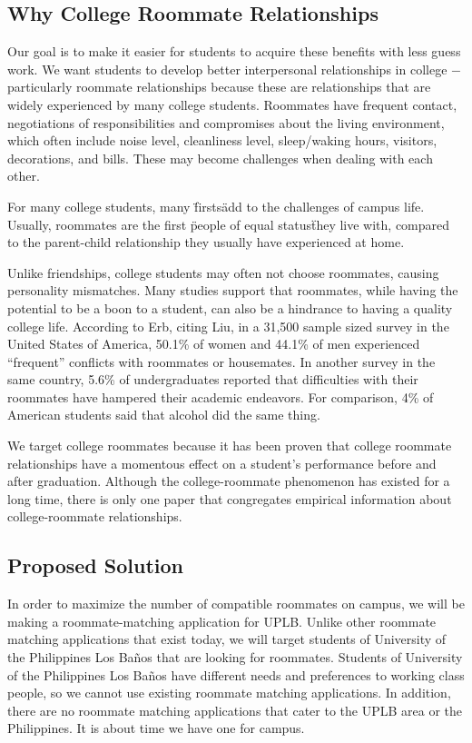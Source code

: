 \documentclass[journal]{./IEEE/IEEEtran}
\newcommand{\UPLB}{University of the Philippines Los Ba\~{n}os }
\begin{document}
    \subsection{Why College Roommate Relationships}
    Our goal is to make it easier for students to acquire these benefits with less guess work. We want students to develop better interpersonal relationships in college $-$ particularly roommate relationships because these are relationships that are widely experienced by many college students\cite{erb}. Roommates have frequent contact, negotiations of responsibilities and compromises about the living environment, which often include noise level, cleanliness level, sleep/waking hours, visitors, decorations, and bills\cite{erb}. These may become challenges when dealing with each other.

    For many college students, many \"firsts\" add to the challenges of campus life. Usually, roommates are the first \"people of equal status\" they live with, compared to the parent-child relationship they usually have experienced at home\cite{erb}.

    Unlike friendships, college students may often not choose roommates, causing personality mismatches. Many studies support that roommates, while having the potential to be a boon to a student, can also be a hindrance to having a quality college life. According to Erb\cite{erb}, citing Liu\cite{liu}, in a 31,500 sample sized survey in the United States of America, 50.1\% of women and 44.1\% of men experienced “frequent” conflicts with roommates or housemates. In another survey in the same country, 5.6\% of undergraduates reported that difficulties with their roommates have hampered their academic endeavors\cite{erb}. For comparison, 4\% of American students said that alcohol did the same thing\cite{erb}.

    We target college roommates because it has been proven that college roommate relationships have a momentous effect on a student's performance before and after graduation. Although the college-roommate phenomenon has existed for a long time, there is only one paper that congregates empirical information about college-roommate relationships\cite{erb}.

    \subsection{Proposed Solution}
    In order to maximize the number of compatible roommates on campus, we will be making a roommate-matching application for UPLB. Unlike other roommate matching applications that exist today, we will target students of \UPLB that are looking for roommates. Students of \UPLB  have different needs and preferences to working class people, so we cannot use existing roommate matching applications. In addition, there are no roommate matching applications that cater to the UPLB area or the Philippines. It is about time we have one for campus.
\end{document}
